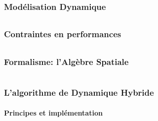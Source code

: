 \documentclass[10pt]{beamer}
\begin{document}
\section{Modélisation Dynamique}

\begin{frame}
  \frametitle{}
  \framesubtitle{}
\end{frame}


\section{Contraintes en performances}

\begin{frame}
  \frametitle{}
  \framesubtitle{}
\end{frame}


\section{Formalisme: l'Algèbre Spatiale}

\begin{frame}
  \frametitle{}
  \framesubtitle{}
\end{frame}


\part{}
\section{L'algorithme de Dynamique Hybride}

\subsection{Principes et implémentation}
\end{document}
